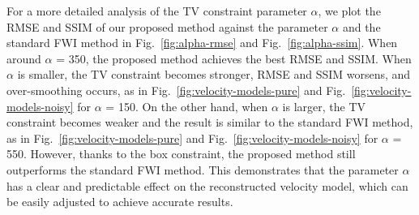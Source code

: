 For a more detailed analysis of the TV constraint parameter $\alpha$, we plot the RMSE and SSIM of our proposed method against the parameter $\alpha$ and the standard FWI method in Fig.~\ref{fig:alpha-rmse} and Fig.~\ref{fig:alpha-ssim}.
When around $\alpha$ = 350, the proposed method achieves the best RMSE and SSIM.
When $\alpha$ is smaller, the TV constraint becomes stronger, RMSE and SSIM worsens, and over-smoothing occurs, as in Fig.~\ref{fig:velocity-models-pure} and Fig.~\ref{fig:velocity-models-noisy} for $\alpha$ = 150.
On the other hand, when $\alpha$ is larger, the TV constraint becomes weaker and the result is similar to the standard FWI method, as in Fig.~\ref{fig:velocity-models-pure} and Fig.~\ref{fig:velocity-models-noisy} for $\alpha$ = 550.
However, thanks to the box constraint, the proposed method still outperforms the standard FWI method.
This demonstrates that the parameter $\alpha$ has a clear and predictable effect on the reconstructed velocity model, which can be easily adjusted to achieve accurate results.

